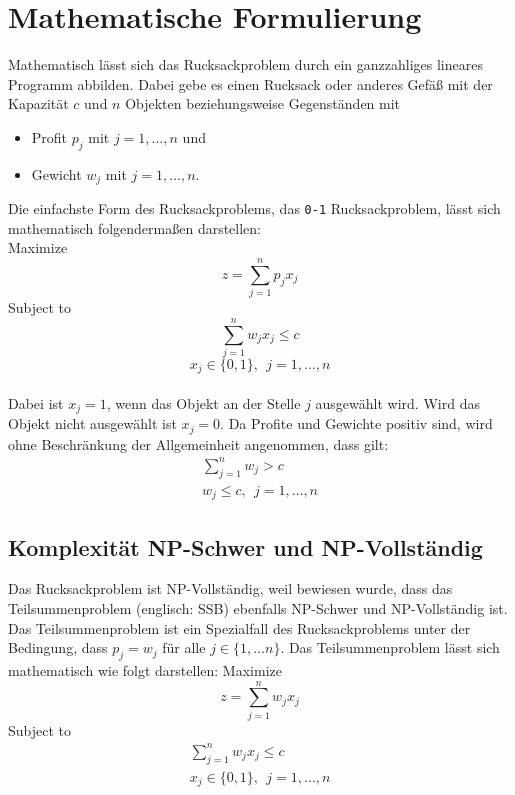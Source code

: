 \chapter{Mathematische Formulierung}
\noindent Mathematisch lässt sich das Rucksackproblem durch ein ganzzahliges lineares Programm abbilden.
Dabei gebe es einen Rucksack oder anderes Gefäß mit der Kapazität $c$ und $n$ Objekten beziehungsweise Gegenständen mit
\begin{itemize}
    \item Profit $p_j$ mit $j=1,\ldots,n$ und
    \item Gewicht $w_j$ mit $j=1,\ldots,n$.
\end{itemize}
Die einfachste Form des Rucksackproblems, das \verb+0-1+ Rucksackproblem, lässt sich mathematisch folgendermaßen darstellen: \cite[vgl.][]{Martello1987}
\\
Maximize
\begin{equation}
z=\sum_{j=1}^{n}{p_jx_j} 
\end{equation}
Subject to 
\begin{equation} \label{eqn:subjectTo}
\sum_{j=1}^{n}{w_jx_j\le c}
\end{equation}
\begin{equation} \label{eqn:bedingung}
x_j\in\{0,1\},\ \ j=1,\ldots,n
\end{equation}
\\
Dabei ist $x_j = 1$, wenn das Objekt an der Stelle $j$ ausgewählt wird. Wird das Objekt nicht ausgewählt ist $x_j = 0$. Da Profite und Gewichte positiv sind, wird ohne Beschränkung der Allgemeinheit angenommen, dass gilt: \cite[vgl.][]{Martello1987}
\begin{eqnarray}
\sum_{j=1}^{n}{w_j>c} \\
w_j\le c,\ \ j=1,\ldots,n
\end{eqnarray}


\section{Komplexität NP-Schwer und NP-Vollständig}
Das Rucksackproblem ist NP-Vollständig, weil bewiesen wurde, dass das Teilsummenproblem (englisch: \ac{SSB}) ebenfalls NP-Schwer und NP-Vollständig ist. 
Das Teilsummenproblem ist ein Spezialfall des Rucksackproblems unter der Bedingung, dass $p_j=w_j$ für alle $j \in \{1, \dots n\}$.
Das Teilsummenproblem lässt sich mathematisch wie folgt darstellen: \cite[vgl.][]{Martello1987}
\newpage
\noindent Maximize
\begin{equation}
z=\sum_{j=1}^{n}{w_jx_j} 
\end{equation}
Subject to 
\begin{eqnarray}
\sum_{j=1}^{n}{w_jx_j\le c}\\
x_j\in\{0,1\},\ \ j=1,\ldots,n
\end{eqnarray}

